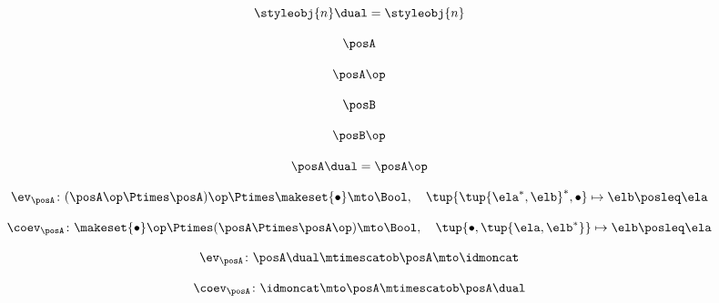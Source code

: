 {\begin{forslides}
    \begin{equation}
        \label{eq:slides_trace_monoidal_21}
        \styleobj{n}\dual = \styleobj{n}
    \end{equation}

    \begin{equation}
        \label{eq:slides_trace_monoidal_22}
        \posA
    \end{equation}

    \begin{equation}
        \label{eq:slides_trace_monoidal_23}
        \posA\op
    \end{equation}

    \begin{equation}
        \label{eq:slides_trace_monoidal_24}
        \posB
    \end{equation}

    \begin{equation}
        \label{eq:slides_trace_monoidal_25}
        \posB\op
    \end{equation}

    \begin{equation}
        \label{eq:slides_trace_monoidal_26}
        \posA\dual = \posA\op
    \end{equation}

    \begin{equation}
        \label{eq:slides_trace_monoidal_27}
        \ev_\posA \colon (\posA\op \Ptimes \posA)\op \Ptimes \makeset{\bullet} \mto \Bool, \quad \tup{\tup{\ela^*, \elb}^*, \bullet} \mapsto \elb \posleq \ela
    \end{equation}

    \begin{equation}
        \label{eq:slides_trace_monoidal_28}
        \coev_\posA \colon \makeset{\bullet}\op \Ptimes (\posA \Ptimes \posA\op)   \mto \Bool, \quad \tup{\bullet, \tup{\ela, \elb^*}} \mapsto \elb \posleq \ela
    \end{equation}

    \begin{equation}
        \label{eq:slides_trace_monoidal_29}
        \ev_\posA \colon \posA\dual \mtimescatob \posA \mto \idmoncat
    \end{equation}

    \begin{equation}
        \label{eq:slides_trace_monoidal_30}
        \coev_\posA \colon \idmoncat \mto \posA \mtimescatob \posA\dual
    \end{equation}


\end{forslides}}
